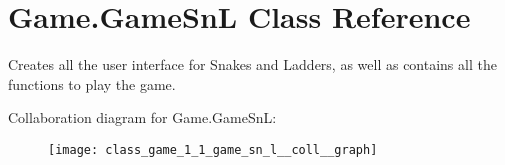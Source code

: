 \hypertarget{class_game_1_1_game_sn_l}{}\section{Game.\+Game\+Sn\+L Class Reference}
\label{class_game_1_1_game_sn_l}


Creates all the user interface for Snakes and Ladders, as well as contains all the functions to play the game.  




Collaboration diagram for Game.\+Game\+Sn\+L\+:\nopagebreak
\begin{figure}[H]
\begin{center}
\leavevmode
\texttt{[image: class\_game\_1\_1\_game\_sn\_l\_\_coll\_\_graph]}
\end{center}
\end{figure}
